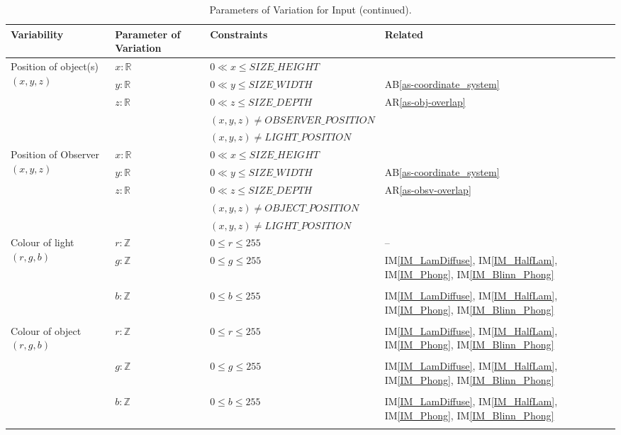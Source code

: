 \documentclass[12pt]{article}
\newcommand{\aBref}[1]{AB\ref{#1}}
\newcommand{\aRref}[1]{AR\ref{#1}}
\newcommand{\iref}[1]{IM\ref{#1}}
\begin{document}
\begin{table}[H]
	\centering
	\begin{tabular}{|p{6cm}|p{5cm}|p{4cm}|p{2cm}|}
		\hline
		\textbf{Variability} & \textbf{Parameter of Variation} & 
		\textbf{Constraints} &  \textbf{Related} \\
		\hline
		\multirow{5}{*}{Position of object(s) $(x,y,z)$} & $x: \mathbb{R}$ & 
		$0 \ll x \le SIZE\_HEIGHT$\\
		&  $y: \mathbb{R}$ & $0 \ll y \le SIZE\_WIDTH$ & 
		\aBref{as-coordinate_system}\\
		& $z: \mathbb{R}$ &  $0 \ll z \le SIZE\_DEPTH$ & 
		\aRref{as-obj-overlap}\\
		& & $(x,y,z) \ne OBSERVER\_POSITION$ &  \\
		& & $(x,y,z) \ne LIGHT\_POSITION$ &  \\
		\hline
		\multirow{5}{*}{Position of Observer $(x,y,z)$} & $x: \mathbb{R}$ & 
		$0 \ll x \le SIZE\_HEIGHT$\\
		&  $y: \mathbb{R}$ & $0 \ll y \le SIZE\_WIDTH$ & 
		\aBref{as-coordinate_system}\\
		& $z: \mathbb{R}$ &  $0 \ll z \le SIZE\_DEPTH$ & 
		\aRref{as-obsv-overlap} \\
		& & $(x,y,z) \ne OBJECT\_POSITION $ & \\
		& & $(x,y,z) \ne LIGHT\_POSITION$ &  \\
		\hline				
		\multirow{3}{*}{Colour of light $(r,g,b)$} & $r: \mathbb{Z}$& $0 \le r 
		\le 255$ & --\\
		& $g: \mathbb{Z}$& $0 \le g \le 255$ & \iref{IM_LamDiffuse}, 
		\iref{IM_HalfLam}, \iref{IM_Phong}, \iref{IM_Blinn_Phong}  \\\\
		& $b: \mathbb{Z}$& $0 \le b \le 255$ & \iref{IM_LamDiffuse}, 
		\iref{IM_HalfLam}, \iref{IM_Phong}, \iref{IM_Blinn_Phong}  \\\\
		\hline
		\multirow{3}{*}{Colour of object $(r,g,b)$} & $r: \mathbb{Z}$& $0 \le r 
		\le 255$ & \iref{IM_LamDiffuse}, 
		\iref{IM_HalfLam}, \iref{IM_Phong}, \iref{IM_Blinn_Phong}  \\\\
		& $g: \mathbb{Z}$& $0 \le g \le 255$ & \iref{IM_LamDiffuse}, 
		\iref{IM_HalfLam}, \iref{IM_Phong}, \iref{IM_Blinn_Phong}  \\\\
		& $b: \mathbb{Z}$& $0 \le b \le 255$ & \iref{IM_LamDiffuse}, 
		\iref{IM_HalfLam}, \iref{IM_Phong}, \iref{IM_Blinn_Phong}  \\\\
		\hline
	\end{tabular}
	\caption{Parameters of Variation for Input (continued).}
	\label{tbl:Input_Variations_cont}
\end{table}
\end{document}
